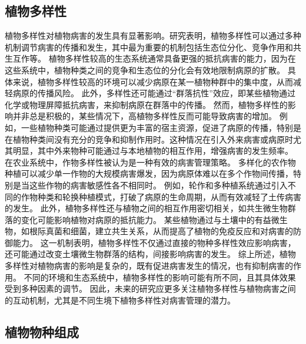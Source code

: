 \documentclass[AutoFakeBold]{LZUThesis-PgD&PhD}
\begin{document}
	\subsection{植物多样性}
	植物多样性对植物病害的发生具有显著影响。研究表明，植物多样性可以通过多种机制调节病害的传播和发生，其中最为重要的机制包括生态位分化、竞争作用和共生互作等。
	植物多样性较高的生态系统通常具备更强的抵抗病害的能力，因为在这些系统中，植物种类之间的竞争和生态位的分化会有效地限制病原的扩散。
	具体来说，植物多样性较高的环境可以减少病原在某一植物种群中的集中度，从而减轻病原的传播风险\cite{Mitchell2002}。
	此外，多样性还可能通过“群落抗性”效应，即某些植物通过化学或物理屏障抵抗病害，来抑制病原在群落中的传播。
	然而，植物多样性的影响并非总是积极的，某些情况下，高植物多样性反而可能导致病害的增加。
	例如，一些植物种类可能通过提供更为丰富的宿主资源，促进了病原的传播，特别是在植物种类间没有充分的竞争和抑制作用时。这种情况在引入外来病害或病原时尤其明显，其中外来物种可能通过与本地植物的相互作用，增强病害的发生频率\cite{Garrett2006}。
	在农业系统中，作物多样性被认为是一种有效的病害管理策略。
	多样化的农作物种植可以减少单一作物的大规模病害爆发，因为病原体难以在多个作物间传播，特别是当这些作物的病害敏感性各不相同时\cite{Pautasso2010}。
	例如，轮作和多种植系统通过引入不同的作物种类和轮换种植模式，打破了病原的生命周期，从而有效减轻了土传病害的发生。
	此外，植物多样性还与植物之间的相互作用密切相关，如共生微生物群落的变化可能影响植物对病原的抵抗能力。
	某些植物通过与土壤中的有益微生物，如根际真菌和细菌，建立共生关系，从而提高了植物的免疫反应和对病害的防御能力\cite{Bever2010}。
	这一机制表明，植物多样性不仅通过直接的物种多样性效应影响病害，还可能通过改变土壤微生物群落的结构，间接影响病害的发生。
	综上所述，植物多样性对植物病害的影响是复杂的，既有促进病害发生的情况，也有抑制病害的作用。
	不同的环境和生态系统中，植物多样性的影响可能有所不同，且其具体效果受到多种因素的调节。
	因此，未来的研究应更多关注植物多样性与植物病害之间的互动机制，尤其是不同生境下植物多样性对病害管理的潜力\cite{Allison2008,Maron2011}。
	
	\subsection{植物物种组成}
	
\end{document}
